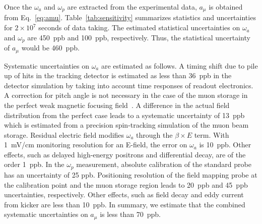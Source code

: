 Once the $\omega_a$ and $\omega_p$ are extracted from the experimental
data, $a_\mu$ is obtained from Eq.~\ref{eq:amu}.
Table~\ref{tab:sensitivity} summarizes statistics and uncertainties for $2 \times 10^7$ seconds of data taking.
The estimated statistical uncertainties on $\omega_a$ and $\omega_p$ are 450~ppb and 100~ppb,
respectively. Thus, the statistical uncertainty of $a_{\mu}$ would be 460~ppb.

Systematic uncertainties on $\omega_a$ are estimated as follows.
A timing shift due to pile up of hits in the tracking detector is estimated as less than 36~ppb
in the detector simulation by taking into account time responses of readout electronics.
A correction for pitch angle is not necessary in the case of the muon storage 
in the perfect weak magnetic focusing field~\cite{Semertzidis:2016kte}. 
A difference in the actual field distribution 
from the perfect case leads to a systematic uncertainty of 13~ppb which is estimated from a precision spin-tracking simulation
of the muon beam storage.
Residual electric field modifies $\omega_a$ through the $\beta \times E$ term. 
With 1~mV/cm monitoring resolution for an E-field, the error on $\omega_a$ is 10~ppb. 
Other effects, such as delayed high-energy positrons and differential decay, are 
of the order 1~ppb.
 In the $\omega_p$ measurement, absolute calibration of the standard probe has an uncertainty of 25 ppb.
Positioning resolution of the field mapping probe at the calibration point and the muon storage
region leads to 20~ppb and 45~ppb uncertainties, respectively.
Other effects, such as field decay and eddy current from kicker are less than 10~ppb.
In summary, we estimate that the combined systematic uncertainties on $a_{\mu}$ is less than 70~ppb.


